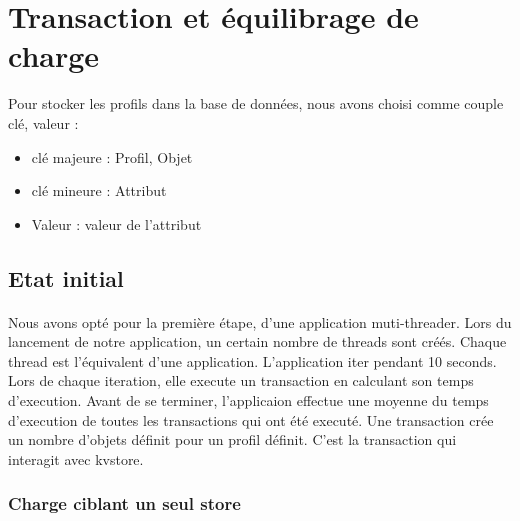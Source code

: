 \section{Transaction et équilibrage de charge}

Pour stocker les profils dans la base de données, nous avons choisi comme couple {clé, valeur} :
\begin{itemize}
\item clé majeure : Profil, Objet
\item clé mineure : Attribut
\item Valeur : valeur de l'attribut
\end{itemize}

\subsection{Etat initial}
\paragraph{}
Nous avons opté pour la première étape, d'une application muti-threader. Lors du lancement de notre application, un certain nombre de threads sont créés. Chaque thread est l'équivalent d'une application. L'application iter pendant 10 seconds. Lors de chaque iteration, elle execute un transaction en calculant son temps d'execution. Avant de se terminer, l'applicaion effectue une moyenne du temps d'execution de toutes les transactions qui ont été executé.
Une transaction crée un nombre d'objets définit pour un profil définit. C'est la transaction qui interagit avec kvstore.

\subsubsection{Charge ciblant un seul store}
